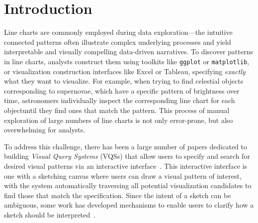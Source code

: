 \vspace{-5pt}
\section{Introduction\label{sec:intro}}
Line charts are commonly employed during data exploration---the intuitive connected patterns often illustrate complex underlying processes
and yield interpretable and visually compelling data-driven narratives. To discover patterns in line charts, analysts construct them
using toolkits like \texttt{ggplot} or \texttt{matplotlib}, or visualization construction interfaces like Excel or Tableau, specifying
{\em exactly} what they want to visualize. For example, when trying to find celestial objects corresponding to supernovae, which have a specific pattern of brightness over time, astronomers individually inspect the corresponding line chart for each objectuntil they find ones that match the pattern.  This process of manual exploration of large numbers of line charts  is not only error-prone, but also overwhelming for analysts.
\par To address this challenge, there has been a large number of papers dedicated to building {\em Visual Query Systems} (VQSs) that allow users to specify and search for desired visual patterns via an interactive interface~\cite{mohebbi2011google,Hochheiser2004,wattenberg2001sketching,Siddiqui2017VLDB,ryall2005querylines,correll2016semantics,Mannino2018,Eichmann2015,Holz2009}. This interactive interface is one with a sketching canvas where users can draw a visual pattern of interest, with the system automatically traversing all potential visualization candidates to find those that match the specification. Since the intent of a sketch can be ambiguous, some work has developed mechanisms to enable users to clarify how a sketch should be interpreted~\cite{ryall2005querylines,correll2016semantics,Mannino2018,Eichmann2015,Holz2009}.
